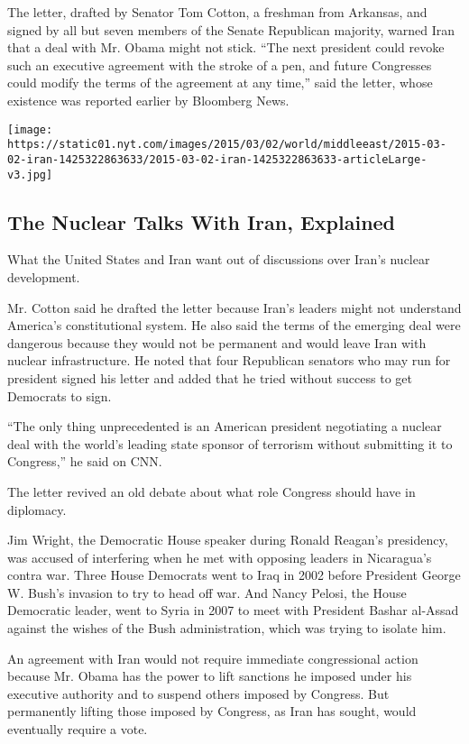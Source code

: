 The letter, drafted by Senator Tom Cotton, a freshman from Arkansas, and
signed by all but seven members of the Senate Republican majority,
warned Iran that a deal with Mr. Obama might not stick. ``The next
president could revoke such an executive agreement with the stroke of a
pen, and future Congresses could modify the terms of the agreement at
any time,'' said the letter, whose existence was reported earlier by
Bloomberg News.

\href{https://www.nytimes.com/interactive/2015/03/02/world/middleeast/2015-03-02-iran.html}{}

\texttt{[image: https://static01.nyt.com/images/2015/03/02/world/middleeast/2015-03-02-iran-1425322863633/2015-03-02-iran-1425322863633-articleLarge-v3.jpg]}

\hypertarget{the-nuclear-talks-with-iran-explained}{%
\subsection{The Nuclear Talks With Iran,
Explained}\label{the-nuclear-talks-with-iran-explained}}

What the United States and Iran want out of discussions over Iran's
nuclear development.

Mr. Cotton said he drafted the letter because Iran's leaders might not
understand America's constitutional system. He also said the terms of
the emerging deal were dangerous because they would not be permanent and
would leave Iran with nuclear infrastructure. He noted that four
Republican senators who may run for president signed his letter and
added that he tried without success to get Democrats to sign.

``The only thing unprecedented is an American president negotiating a
nuclear deal with the world's leading state sponsor of terrorism without
submitting it to Congress,'' he said on CNN.

The letter revived an old debate about what role Congress should have in
diplomacy.

Jim Wright, the Democratic House speaker during Ronald Reagan's
presidency, was accused of interfering when he met with opposing leaders
in Nicaragua's contra war. Three House Democrats went to Iraq in 2002
before President George W. Bush's invasion to try to head off war. And
Nancy Pelosi, the House Democratic leader, went to Syria in 2007 to meet
with President Bashar al-Assad against the wishes of the Bush
administration, which was trying to isolate him.

An agreement with Iran would not require immediate congressional action
because Mr. Obama has the power to lift sanctions he imposed under his
executive authority and to suspend others imposed by Congress. But
permanently lifting those imposed by Congress, as Iran has sought, would
eventually require a vote.

